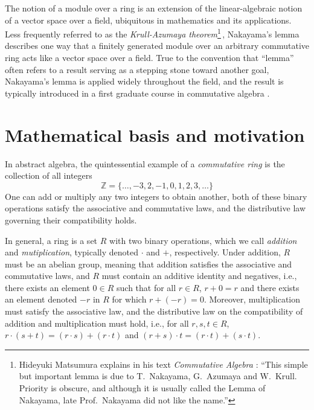 \documentclass{article}
\begin{document}
The notion of a module over a ring is an extension of the linear-algebraic notion of a vector space over a field, ubiquitous in mathematics and its applications. 
Less frequently referred to as the \emph{Krull-Azumaya theorem}\footnote{Hideyuki Matsumura explains in his text \emph{Commutative Algebra} \cite{matsumura}:  ``{This simple but important lemma is due to T.\ Nakayama, G.\ Azumaya
and W.\ Krull. Priority is obscure, and although it is usually called the Lemma of Nakayama, late Prof.\  Nakayama did not like the name.''}}\,\cite{nagata}, Nakayama's lemma 
describes one way that a finitely generated module over an arbitrary commutative ring acts like a vector space over a field.  
True to the convention that ``lemma'' often refers to a result serving as a stepping stone toward another goal, Nakayama's lemma is applied widely throughout the field, and the result is typically introduced in a first graduate course in commutative algebra \cite{atiyah-macdonald, matsumura, eisenbud}.   






\section{Mathematical basis and motivation}

In abstract algebra, the quintessential example of a \emph{commutative ring} is the collection of all integers \[\mathbb{Z} = \{ \ldots, -3, 2, -1, 0, 1, 2, 3, \ldots \}\]
One can add or multiply any two integers to obtain another, both of these binary operations satisfy the associative and commutative laws, and the distributive law governing their compatibility holds. 





In general, a ring is a set $R$ with two binary operations, which we call \emph{addition} and \emph{mutiplication}, typically denoted $\cdot$ and $+$, respectively.  Under addition, $R$ must be an abelian group, meaning that addition satisfies the associative and commutative laws, and $R$ must contain an additive identity and negatives, i.e., there exists an element $0 \in R$ such that for all $r \in R$,  $r+0 = r$  and there exists an element denoted $-r$ in $R$ for which $r + (-r) = 0$.
Moreover, multiplication must satisfy the associative law, and the distributive law on the compatibility of addition and multiplication must hold, i.e., for all $r, s, t \in R$, $r \cdot (s+t) = (r \cdot s)  + (r \cdot t)$ and $(r+s)\cdot t = (r \cdot t) + (s \cdot t)$. 
\end{document}
